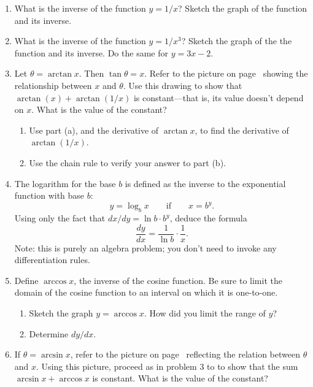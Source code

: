 \begin{enumerate}
\item What is the inverse of the function $y = 1/x$?  Sketch the graph
of the function and its inverse.


\item What is the inverse of the function $y = 1/x^3$?  Sketch the
graph of the the function and its inverse.  Do the same for $y = 3x -
2$.


\item Let $\theta=\arctan{x}$.  Then $\tan{\theta} = x$.  Refer to the
picture on page~\pageref{picture2} showing the relationship between $x$
and $\theta$.  Use this drawing to show that $\arctan(x) +
\arctan(1/x)$ is constant---that is, its value doesn't depend on $x$.
What is the value of the constant?

  \begin{enumerate}
  \item Use part (a), and the derivative of $\arctan{x}$, to find the
derivative of $\arctan(1/x)$.

  \item Use the chain rule to verify your answer to part (b).


\end{enumerate}
\item The logarithm for the base $b$ is defined as the inverse to the
exponential function with base $b$:
	\[
y = \log_b{x} \qquad \mbox{if} \qquad x = b^y.
\]
Using only the fact that $dx/dy = \ln{b} \cdot b^y$, deduce the formula
	\[
\dfrac{dy}{dx} = \dfrac{1}{\ln{b}} \cdot \dfrac{1}{x}.
\]
Note: this is purely an algebra problem; you don't need to invoke any
differentiation rules.


\item Define $\arccos{x}$, the inverse of
the cosine function.  Be sure to limit the domain of the cosine
function to an interval on which it is one-to-one.

  \begin{enumerate}
  \item Sketch the graph $y = \arccos{x}$.  How did you limit the range
of $y$?

  \item Determine $dy/dx$.


\end{enumerate}
\item If $\theta = \arcsin{x}$, refer to the picture on
page~\pageref{picture} reflecting the relation between $\theta$ and
$x$.  Using this picture, proceed as in problem 3 to to show that the
sum $\arcsin{x} + \arccos{x}$ is constant.  What is the value of the
constant?


\end{enumerate}
